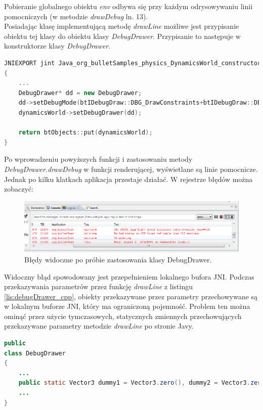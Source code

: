 Pobieranie globalnego obiektu \emph{env} odbywa się przy każdym odrysowywaniu
linii pomocniczych (w metodzie \emph{drawDebug} ln. 13).\\
Posiadając klasę implementującą metodę \emph{drawLine} możliwe jest przypisanie
obiektu tej klasy do obiektu klasy \emph{DebugDrawer}. Przypisanie to następuje
w konstruktorze klasy \emph{DebugDrawer}.

\newpage
\begin{lstlisting}[language=c++, caption=Przypisanie
obiektu DebugDrawer obiektowi DynamicsWorld,label=lis:DynamicsWorldConstructor]
JNIEXPORT jint Java_org_bulletSamples_physics_DynamicsWorld_constructor( JNIEnv* env, jobject self )
{
	...
    DebugDrawer* dd = new DebugDrawer;
    dd->setDebugMode(btIDebugDraw::DBG_DrawConstraints+btIDebugDraw::DBG_DrawConstraintLimits);
    dynamicsWorld->setDebugDrawer(dd);

	return btObjects::put(dynamicsWorld);
}
\end{lstlisting}

Po wprowadzeniu powyższych funkcji i zastosowaniu metody
\emph{DebugDrawer.drawDebug} w funkcji renderującej, wyświetlane są linie
pomocnicze. Jednak po kilku klatkach aplikacja przestaje działać. W rejestrze
błędów można zobaczyć:

\begin{figure}[H]
\centering
\includegraphics[scale = 0.6]{./img/logCat.PNG}
\caption{Błędy widoczne po próbie zastosowania klasy DebugDrawer.}
\label{fig:logCat}
\end{figure}

Widoczny błąd spowodowany jest przepełnieniem lokalnego bufora JNI. Podczas
przekazywania parametrów przez funkcję \emph{drawLine} z listingu
\ref{lis:debugDrawer_cpp}, obiekty przekazywane przez parametry przechowywane są
w lokalnym buforze JNI, który ma ograniczoną pojemność. Problem ten można ominąć
przez użycie tymczasowych, statycznych zmiennych przechowujących przekazywane
parametry metodzie \emph{drawLine} po stronie Javy.

\begin{lstlisting}[language=Java,
caption=Tymczasowe zmienne przechowujące
parametry wywołania metody drawLine,label=lis:dummyVals] public
class DebugDrawer
{
	...
	public static Vector3 dummy1 = Vector3.zero(), dummy2 = Vector3.zero(), dummy3 = Vector3.zero(), dummy4 = Vector3.zero(); 
	...
}
\end{lstlisting}

